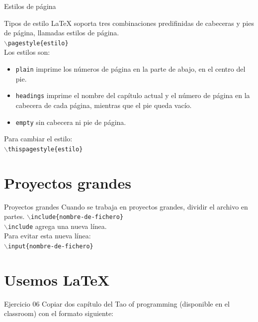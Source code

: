 \begin{frame}{Estilos de p\'agina}
    \begin{block}{Tipos de estilo}
        \LaTeX{} soporta tres combinaciones predifinidas de cabeceras y pies de página, llamadas estilos de p\'agina. \\
        \texttt{$\backslash$pagestyle\{estilo\}} \\
        Los estilos son:
        \begin{itemize}
            \item \texttt{plain} imprime los n\'umeros de página en la parte de abajo, en el centro del pie. 
            \item \texttt{headings} imprime el nombre del capítulo actual y el n\'umero de p\'agina en la cabecera de cada p\'agina, mientras que el pie queda vac\'io.
            \item \texttt{empty} sin cabecera ni pie de p\'agina.
        \end{itemize}
        Para cambiar el estilo: \\
        \texttt{$\backslash$thispagestyle\{estilo\}}
    \end{block}
\end{frame}

\section{Proyectos grandes}

\begin{frame}{Proyectos grandes}
    Cuando se trabaja en proyectos grandes, dividir el archivo en partes.
    \texttt{$\backslash$include\{nombre-de-fichero\}}\\
    \texttt{$\backslash$include} agrega una nueva l\'inea.\\
    Para evitar esta nueva l\'inea:\\
    \texttt{$\backslash$input\{nombre-de-fichero\}}
\end{frame}

\section{Usemos \LaTeX}

\begin{frame}{Ejercicio 06}
    Copiar dos cap\'itulo del Tao of programming (disponible en el classroom) con el formato siguiente:
\end{frame}

